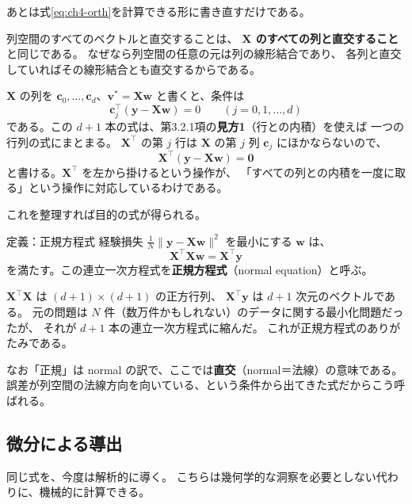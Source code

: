 あとは式\eqref{eq:ch4-orth}を計算できる形に書き直すだけである。

列空間のすべてのベクトルと直交することは、
\textbf{$\bm{X}$ のすべての列と直交すること}と同じである。
なぜなら列空間の任意の元は列の線形結合であり、
各列と直交していればその線形結合とも直交するからである。

$\bm{X}$ の列を $\bm{c}_0, \ldots, \bm{c}_d$、$\bm{v}^* = \bm{X}\bm{w}$ と書くと、条件は
\begin{equation*}
  \bm{c}_j^\top (\bm{y} - \bm{X}\bm{w}) = 0 \qquad (j = 0, 1, \ldots, d)
\end{equation*}
である。この $d+1$ 本の式は、第3.2.1項の\textbf{見方1}（行との内積）を使えば
一つの行列の式にまとまる。
$\bm{X}^\top$ の第 $j$ 行は $\bm{X}$ の第 $j$ 列 $\bm{c}_j$ にほかならないので、
\begin{equation}
  \bm{X}^\top (\bm{y} - \bm{X}\bm{w}) = \bm{0}
  \label{eq:ch4-orth-matrix}
\end{equation}
と書ける。$\bm{X}^\top$ を左から掛けるという操作が、
「すべての列との内積を一度に取る」という操作に対応しているわけである。

これを整理すれば目的の式が得られる。

\begin{itembox}[l]{定義：正規方程式}
経験損失 $\frac{1}{N}\|\bm{y} - \bm{X}\bm{w}\|^2$ を最小にする $\bm{w}$ は、
\begin{equation}
  \bm{X}^\top \bm{X} \bm{w} = \bm{X}^\top \bm{y}
  \label{eq:normal-equation}
\end{equation}
を満たす。この連立一次方程式を\textbf{正規方程式}（normal equation）と呼ぶ。
\end{itembox}

$\bm{X}^\top\bm{X}$ は $(d+1) \times (d+1)$ の正方行列、
$\bm{X}^\top\bm{y}$ は $d+1$ 次元のベクトルである。
元の問題は $N$ 件（数万件かもしれない）のデータに関する最小化問題だったが、
それが $d+1$ 本の連立一次方程式に縮んだ。
これが正規方程式のありがたみである。

なお「正規」は normal の訳で、ここでは\textbf{直交}（normal＝法線）の意味である。
誤差が列空間の法線方向を向いている、という条件から出てきた式だからこう呼ばれる。


\subsection{微分による導出}

同じ式を、今度は解析的に導く。
こちらは幾何学的な洞察を必要としない代わりに、機械的に計算できる。


